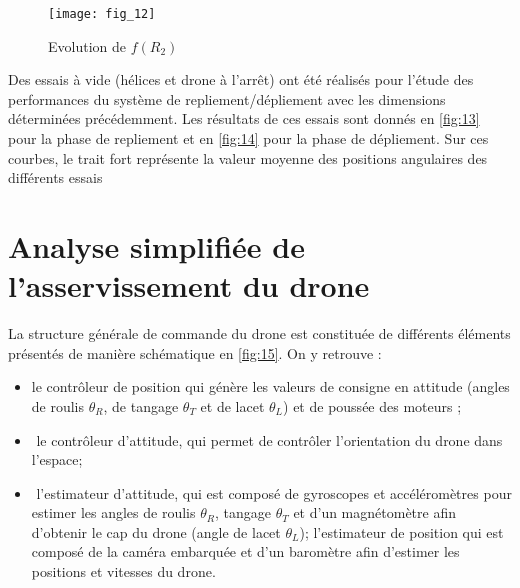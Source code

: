 \begin{figure}[H]
\centering
\texttt{[image: fig\_12]}
\caption{\label{fig:12} Evolution de $f(R_2)$}
\end{figure}

\ifprof
\begin{corrige}
\end{corrige}
\else
\fi

Des essais à vide (hélices et drone à l’arrêt) ont été réalisés pour l’étude des performances
du système de repliement/dépliement avec les dimensions déterminées précédemment. Les
résultats de ces essais sont donnés en \autoref{fig:13} pour la phase de repliement et en \autoref{fig:14}
pour la phase de dépliement. Sur ces courbes, le trait fort représente la valeur moyenne des
positions angulaires des différents essais

\ifprof
\begin{corrige}
\end{corrige}
\else
\fi

\ifprof
\begin{corrige}
\end{corrige}
\else
\fi

\section{\label{sec:03} Analyse simplifiée de l’asservissement du drone}

La structure générale de commande du drone est constituée de différents éléments présentés de manière schématique en \autoref{fig:15}. On y retrouve :
\begin{itemize}
\item le contrôleur de position qui génère les valeurs de consigne en attitude 
(angles de roulis $\theta_R$, 
de tangage $\theta_T$ 
et de lacet $\theta_L$)
et de poussée des moteurs ;
\item­ le contrôleur d’attitude, qui permet de contrôler l’orientation du drone dans l’espace;
\item­ l’estimateur d’attitude, qui est composé de gyroscopes et accéléromètres pour estimer
les angles de roulis $\theta_R$, tangage $\theta_T$ et d’un magnétomètre afin d’obtenir le cap du drone
(angle de lacet $\theta_L$);
­ l’estimateur de position qui est composé de la caméra embarquée et d’un baromètre
afin d’estimer les positions et vitesses du drone.
\end{itemize}

